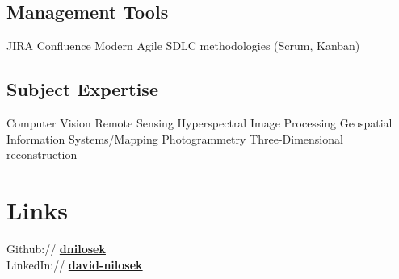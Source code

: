 \documentclass[]{nilosek-resume}
\begin{document}
\begin{minipage}[t]{0.25\textwidth}
\subsection{Management Tools}
JIRA \textbullet{} Confluence \textbullet{} Modern Agile SDLC methodologies (Scrum, Kanban)\\
\sectionsep
\subsection{Subject Expertise}
Computer Vision \textbullet{} Remote Sensing \textbullet{} Hyperspectral Image Processing \textbullet{} Geospatial Information Systems/Mapping \textbullet{} Photogrammetry \textbullet{} Three-Dimensional reconstruction

\section{Links} 
Github:// \href{https://github.com/dnilosek}{\bf dnilosek} \\
LinkedIn://  \href{https://www.linkedin.com/in/david-nilosek-aab5a696}{\bf david-nilosek} \\



%
%

\end{minipage} 
\hfill
\end{document}
